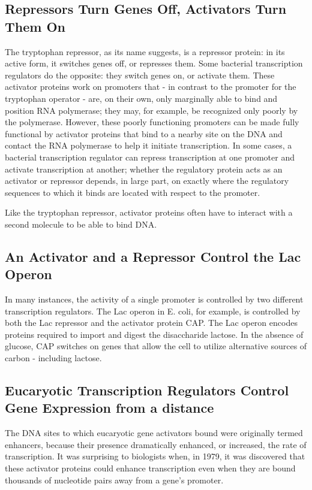\subsection{Repressors Turn Genes Off, Activators Turn Them On}

The tryptophan repressor, as its name suggests, is a repressor protein:
in its active form, it switches genes off, or represses them. Some bacterial
transcription regulators do the opposite: they switch genes on, or activate
them. These activator proteins work on promoters that - in contrast to
the promoter for the tryptophan operator - are, on their own, only marginally
able to bind and position RNA polymerase; they may, for example,
be recognized only poorly by the polymerase. However, these poorly
functioning promoters can be made fully functional by activator proteins
that bind to a nearby site on the DNA and contact the RNA polymerase to
help it initiate transcription. In some cases, a bacterial transcription
regulator can repress transcription at one promoter and activate
transcription at another; whether the regulatory protein acts as an activator
or repressor depends, in large part, on exactly where the regulatory
sequences to which it binds are located with respect to the promoter.

Like the tryptophan repressor, activator proteins often have to interact
with a second molecule to be able to bind DNA.

\subsection{An Activator and a Repressor Control the Lac Operon}

In many instances, the activity of a single promoter is controlled by two
different transcription regulators. The Lac operon in E. coli, for example,
is controlled by both the Lac repressor and the activator protein CAP. The
Lac operon encodes proteins required to import and digest the disaccharide
lactose. In the absence of glucose, CAP switches on genes that
allow the cell to utilize alternative sources of carbon - including lactose.

\subsection{Eucaryotic Transcription Regulators Control Gene Expression from a distance}

The DNA sites to which eucaryotic gene activators bound were originally termed enhancers,
because their presence dramatically enhanced, or increased, the rate of
transcription. It was surprising to biologists when, in 1979, it was discovered
that these activator proteins could enhance transcription even when
they are bound thousands of nucleotide pairs away from a gene’s promoter.

